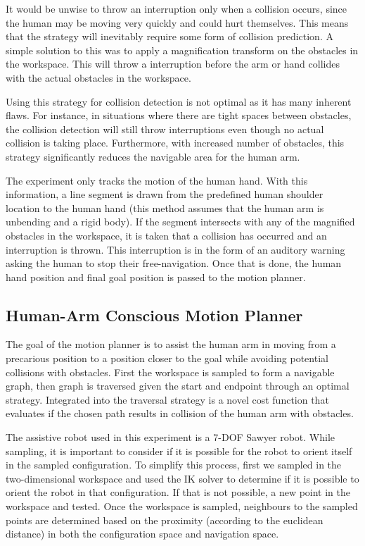It would be unwise to throw an interruption only when a collision occurs, since the human may be moving very quickly and could hurt themselves. 
This means that the strategy will inevitably require some form of collision prediction. 
A simple solution to this was to apply a magnification transform on the obstacles in the workspace. 
This will throw a interruption before the arm or hand collides with the actual obstacles in the workspace. 

Using this strategy for collision detection is not optimal as it has many inherent flaws. 
For instance, in situations where there are tight spaces between obstacles, the collision detection will still throw interruptions even though no actual collision is taking place. 
Furthermore, with increased number of obstacles, this strategy significantly reduces the navigable area for the human arm. 

The experiment only tracks the motion of the human hand. 
With this information, a line segment is drawn from the predefined human shoulder location to the human hand (this method assumes that the human arm is unbending and a rigid body). 
If the segment intersects with any of the magnified obstacles in the workspace, it is taken that a collision has occurred and an interruption is thrown. 
This interruption is in the form of an auditory warning asking the human to stop their free-navigation. 
Once that is done, the human hand position and final goal position is passed to the motion planner.

\subsection{Human-Arm Conscious Motion Planner}
The goal of the motion planner is to assist the human arm in moving from a precarious position to a position closer to the goal while avoiding potential collisions with obstacles. 
First the workspace is sampled to form a navigable graph, then graph is traversed given the start and endpoint through an optimal strategy. 
Integrated into the traversal strategy is a novel cost function that evaluates if the chosen path results in collision of the human arm with obstacles. 

The assistive robot used in this experiment is a 7-DOF Sawyer robot. 
While sampling, it is important to consider if it is possible for the robot to orient itself in the sampled configuration. 
To simplify this process, first we sampled in the two-dimensional workspace and used the IK solver to determine if it is possible to orient the robot in that configuration. 
If that is not possible, a new point in the workspace and tested.  
Once the workspace is sampled, neighbours to the sampled points are determined based on the proximity (according to the euclidean distance) in both the configuration space and navigation space. 


